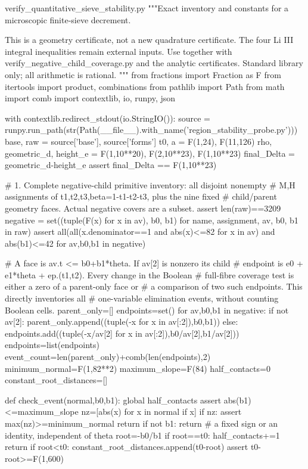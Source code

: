 \begin{filecontents*}[overwrite]{verify_quantitative_sieve_stability.py}
"""Exact inventory and constants for a microscopic finite-sieve decrement.

This is a geometry certificate, not a new quadrature certificate.
The four Li III integral inequalities remain external inputs.
Use together with verify_negative_child_coverage.py and the analytic
certificates.  Standard library only; all arithmetic is rational.
"""
from fractions import Fraction as F
from itertools import product, combinations
from pathlib import Path
from math import comb
import contextlib, io, runpy, json

with contextlib.redirect_stdout(io.StringIO()):
    source = runpy.run_path(str(Path(__file__).with_name('region_stability_probe.py')))
base, raw = source['base'], source['forms']
t0, a = F(1,24), F(11,126)
rho, geometric_d, height_e = F(1,10**20), F(2,10**23), F(1,10**23)
final_Delta = geometric_d-height_e
assert final_Delta == F(1,10**23)

# 1. Complete negative-child primitive inventory: all disjoint nonempty
# M,H assignments of t1,t2,t3,beta=1-t1-t2-t3, plus the nine fixed
# child/parent geometry faces.  Actual negative covers are a subset.
assert len(raw)==3209
negative = set((tuple(F(x) for x in av), b0, b1)
               for name, assignment, av, b0, b1 in raw)
assert all(all(x.denominator==1 and abs(x)<=82 for x in av)
           and abs(b1)<=42 for av,b0,b1 in negative)

# A face is av.t <= b0+b1*theta.  If av[2] is nonzero its child
# endpoint is e0 + e1*theta + ep.(t1,t2).  Every change in the Boolean
# full-fibre coverage test is either a zero of a parent-only face or
# a comparison of two such endpoints.  This directly inventories all
# one-variable elimination events, without counting Boolean cells.
parent_only=[]
endpoints=set()
for av,b0,b1 in negative:
    if not av[2]:
        parent_only.append((tuple(-x for x in av[:2]),b0,b1))
    else:
        endpoints.add((tuple(-x/av[2] for x in av[:2]),b0/av[2],b1/av[2]))
endpoints=list(endpoints)
event_count=len(parent_only)+comb(len(endpoints),2)
minimum_normal=F(1,82**2)
maximum_slope=F(84)
half_contacts=0
constant_root_distances=[]

def check_event(normal,b0,b1):
    global half_contacts
    assert abs(b1)<=maximum_slope
    nz=[abs(x) for x in normal if x]
    if nz:
        assert max(nz)>=minimum_normal
        return
    if not b1:
        return  # a fixed sign or an identity, independent of theta
    root=-b0/b1
    if root==t0:
        half_contacts+=1
        return
    if root<t0:
        constant_root_distances.append(t0-root)
        assert t0-root>=F(1,600)


\end{filecontents*}
